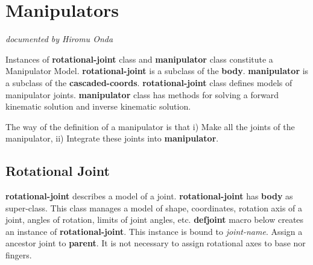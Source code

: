 \newpage
\section{\label{ManipulatorModel}Manipulators}
\hfill {\em documented by Hiromu Onda}


Instances of {\bf rotational-joint} class and {\bf manipulator} class 
constitute a Manipulator Model. {\bf rotational-joint} is a subclass of the 
{\bf body}. {\bf manipulator} is a subclass of the {\bf cascaded-coords}.
{\bf rotational-joint} class defines models of manipulator joints. 
{\bf manipulator} class has methods for solving a forward kinematic solution and 
inverse kinematic solution. 

The way of the definition of a manipulator is that i) Make all the 
joints of the manipulator, ii) Integrate these joints into {\bf manipulator}.



\subsection{
Rotational Joint
}

{\bf rotational-joint} describes a model of a joint. 
{\bf rotational-joint} has {\bf body} as super-class.
This class manages a model of shape, coordinates, rotation axis of a joint, 
angles of rotation, limits of joint angles, etc.
{\bf defjoint} macro below creates an instance of {\bf rotational-joint}.
This instance is bound to {\em joint-name}. Assign a ancestor joint to 
{\bf parent}. It is not necessary to assign rotational axes to base nor 
fingers. 


